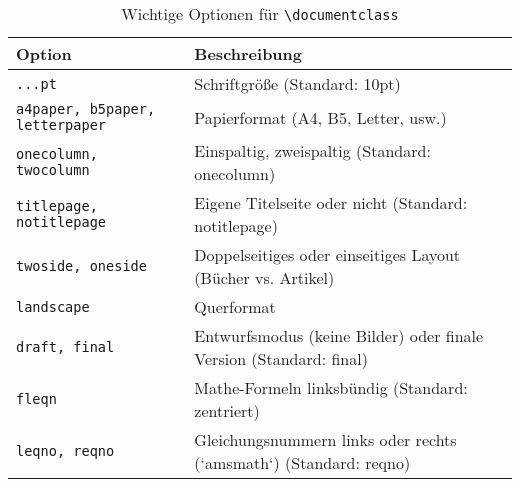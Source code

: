 \begin{table}[H]
    \centering
    \begin{tabular}{ll}
        \toprule
        \textbf{Option}                        & \textbf{Beschreibung}                                              \\
        \midrule
        \texttt{...pt}                         & Schriftgröße (Standard: 10pt)                                      \\
        \texttt{a4paper, b5paper, letterpaper} & Papierformat (A4, B5, Letter, usw.)                                \\
        \texttt{onecolumn, twocolumn}          & Einspaltig, zweispaltig (Standard: onecolumn)                      \\
        \texttt{titlepage, notitlepage}        & Eigene Titelseite oder nicht    (Standard: notitlepage)            \\
        \texttt{twoside, oneside}              & Doppelseitiges oder einseitiges Layout (Bücher vs. Artikel)        \\
        \texttt{landscape}                     & Querformat                                                         \\
        \texttt{draft, final}                  & Entwurfsmodus (keine Bilder) oder finale Version (Standard: final) \\
        \texttt{fleqn}                         & Mathe-Formeln linksbündig (Standard: zentriert)                    \\
        \texttt{leqno, reqno}                  & Gleichungsnummern links oder rechts (`amsmath`) (Standard: reqno)  \\
        \bottomrule
    \end{tabular}
    \caption{Wichtige Optionen für \texttt{\textbackslash documentclass}}
    \label{tab:documentclass-options}
\end{table}